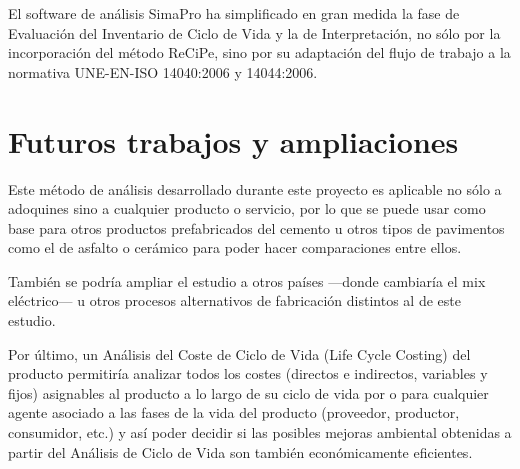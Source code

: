 El software de análisis SimaPro ha simplificado en gran medida la fase de Evaluación del Inventario de Ciclo de Vida y la de Interpretación, no sólo por la incorporación del método ReCiPe, sino por su adaptación del flujo de trabajo a la normativa UNE-EN-ISO 14040:2006 y 14044:2006.


\section{Futuros trabajos y ampliaciones}

Este método de análisis desarrollado durante este proyecto es aplicable no sólo a adoquines sino a cualquier producto o servicio, por lo que se puede usar como base para otros productos prefabricados del cemento u otros tipos de pavimentos como el de asfalto o cerámico para poder hacer comparaciones entre ellos.

También se podría ampliar el estudio a otros países —donde cambiaría el mix eléctrico— u otros procesos alternativos de fabricación distintos al de este estudio.

Por último, un Análisis del Coste de Ciclo de Vida (Life Cycle Costing) del producto permitiría analizar todos los costes (directos e indirectos, variables y fijos) asignables al producto a lo largo de su ciclo de vida por o para cualquier agente asociado a las fases de la vida del producto (proveedor, productor, consumidor, etc.) y así poder decidir si las posibles mejoras ambiental obtenidas a partir del Análisis de Ciclo de Vida son también económicamente eficientes.
